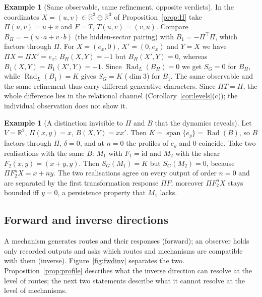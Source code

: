 \documentclass[11pt,a4paper]{article}
\newcommand{\RR}{\mathbb{R}}
\newcommand{\Rad}{\operatorname{Rad}}
\newcommand{\spn}{\operatorname{span}}
\newcommand{\id}{\mathrm{id}}
\newcommand{\defic}{\delta}
\theoremstyle{plain}
\theoremstyle{definition}
\newtheorem{example}[theorem]{Example}
\begin{document}
\begin{example}[Same observable, same refinement, opposite verdicts]\label{ex:H8}
In the coordinates $X=(u,v)\in\RR^3\oplus\RR^3$ of Proposition~\ref{prop:H} take $\Pi(u,v)=u+v$ and $F=T$, $T(u,v)=(v,u)$.
Compare $B_H=-(u\cdot a+v\cdot b)$ (the hidden-sector pairing) with $B_1=-\Pi^{\!\top}\Pi$, which factors through $\Pi$.
For $X=(e_x,0)$, $X'=(0,e_x)$ and $Y=X$ we have $\Pi X=\Pi X'=e_x$; $B_H(X,Y)=-1$ but $B_H(X',Y)=0$, whereas $B_1(X,Y)=B_1(X',Y)=-1$.
Since $\Rad_L(B_H)=0$ we get $S_G=0$ for $B_H$, while $\Rad_L(B_1)=K$ gives $S_G=K$ ($\dim 3$) for $B_1$.
The same observable and the same refinement thus carry different generative characters. Since $\Pi T=\Pi$, the whole difference lies in the relational channel (Corollary~\ref{cor:levels}(c)); the individual observation does not show it.
\end{example}

\begin{example}[A distinction invisible to $\Pi$ and $B$ that the dynamics reveals]\label{ex:dyn}
Let $V=\RR^2$, $\Pi(x,y)=x$, $B(X,Y)=xx'$. Then $K=\spn\{e_y\}=\Rad(B)$, so $B$ factors through $\Pi$, $\defic=0$, and at $n=0$ the profiles of $e_y$ and $0$ coincide.
Take two realisations with the same $B$: $M_1$ with $F_1=\id$ and $M_2$ with the shear $F_2(x,y)=(x+y,y)$.
Then $S_G(M_1)=K$ but $S_G(M_2)=0$, because $\Pi F_2^nX=x+ny$.
The two realisations agree on every output of order $n=0$ and are separated by the first transformation response $\Pi F$; moreover $\Pi F_2^nX$ stays bounded iff $y=0$, a persistence property that $M_1$ lacks.
\end{example}

\subsection{Forward and inverse directions}
A mechanism generates routes and their responses (forward); an observer holds only recorded outputs and asks which routes and mechanisms are compatible with them (inverse).
Figure~\ref{fig:fwdinv} separates the two. Proposition~\ref{prop:profile} describes what the inverse direction can resolve at the level of routes; the next two statements describe what it cannot resolve at the level of mechanisms.
\end{document}
